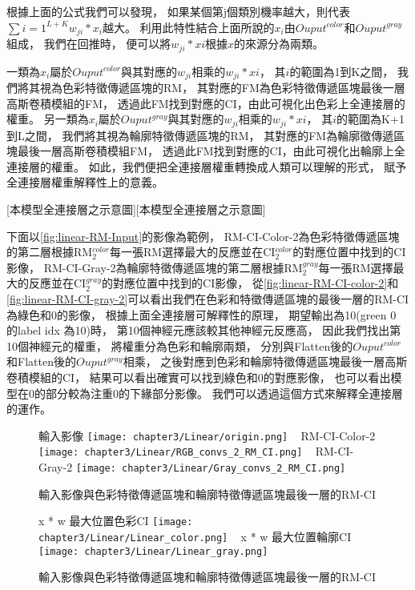 \documentclass[class=NCU_thesis, crop=false]{standalone}
\begin{document}
根據上面的公式我們可以發現，
如果某個第j個類別機率越大，則代表$\sum{i=1}^{L+K}w_{ji} * x_{i}$越大。
利用此特性結合上面所說的$x_{i}$由$Ouput^{color}$和$Ouput^{gray}$組成，
我們在回推時，
便可以將$w_{ji} * x{i}$根據$x$的來源分為兩類。

一類為$x_{i}$屬於$Ouput^{color}$與其對應的$w_{ji}$相乘的$w_{ji} * x{i}$，
其$i$的範圍為1到K之間，
我們將其視為色彩特徵傳遞區塊的RM，
其對應的FM為色彩特徵傳遞區塊最後一層高斯卷積模組的FM，
透過此FM找到對應的CI，由此可視化出色彩上全連接層的權重。
另一類為$x_{i}$屬於$Ouput^{gray}$與其對應的$w_{ji}$相乘的$w_{ji} * x{i}$，
其$i$的範圍為K+1到L之間，
我們將其視為輪廓特徵傳遞區塊的RM，
其對應的FM為輪廓徵傳遞區塊最後一層高斯卷積模組FM，
透過此FM找到對應的CI，由此可視化出輪廓上全連接層的權重。
如此，我們便把全連接層權重轉換成人類可以理解的形式，
賦予全連接層權重解釋性上的意義。

[本模型全連接層之示意圖][本模型全連接層之示意圖]

下面以\cref{fig:linear-RM-Input}的影像為範例，
RM-CI-Color-2為色彩特徵傳遞區塊的第二層根據RM$^{color}_{2}$每一張RM選擇最大的反應並在CI$^{color}_{2}$的對應位置中找到的CI影像，
RM-CI-Gray-2為輪廓特徵傳遞區塊的第二層根據RM$^{gray}_{2}$每一張RM選擇最大的反應並在CI$^{gray}_{2}$的對應位置中找到的CI影像，
從\cref{fig:linear-RM-CI-color-2}和\cref{fig:linear-RM-CI-gray-2}可以看出我們在色彩和特徵傳遞區塊的最後一層的RM-CI為綠色和0的影像，
根據上面全連接層可解釋性的原理，
期望輸出為10(green 0 的label idx 為10)時，
第10個神經元應該較其他神經元反應高，
因此我們找出第10個神經元的權重，
將權重分為色彩和輪廓兩類，
分別與Flatten後的$Ouput^{color}$和Flatten後的$Ouput^{gray}$相乘，
之後對應到色彩和輪廓特徵傳遞區塊最後一層高斯卷積模組的CI，
結果可以看出確實可以找到綠色和0的對應影像，
也可以看出模型在0的部分較為注重0的下緣部分影像。
我們可以透過這個方式來解釋全連接層的運作。

\begin{figure}[H]
    \centering
    \subcaptionbox
        {輸入影像
        \label{fig:linear-RM-Input}}
        {\texttt{[image: chapter3/Linear/origin.png]}}
    ~
    \subcaptionbox
        {RM-CI-Color-2
        \label{fig:linear-RM-CI-color-2}}
        {\texttt{[image: chapter3/Linear/RGB\_convs\_2\_RM\_CI.png]}}
    ~
    \subcaptionbox
        {RM-CI-Gray-2
        \label{fig:linear-RM-CI-gray-2}}
        {\texttt{[image: chapter3/Linear/Gray\_convs\_2\_RM\_CI.png]}}
    \caption{輸入影像與色彩特徵傳遞區塊和輪廓特徵傳遞區塊最後一層的RM-CI\cite{YangCNNInterpretable}}
    \label{fig:RM-CI}
\end{figure}

\begin{figure}[H]
    \centering
    \subcaptionbox
        {x * w 最大位置色彩CI
        \label{fig:linear-rgb}}
        {\texttt{[image: chapter3/Linear/Linear\_color.png]}}
    ~
    \subcaptionbox
        {x * w 最大位置輪廓CI
        \label{fig:linear-gray}}
        {\texttt{[image: chapter3/Linear/Linear\_gray.png]}}
    \caption{輸入影像與色彩特徵傳遞區塊和輪廓特徵傳遞區塊最後一層的RM-CI\cite{YangCNNInterpretable}}
    \label{fig:Linear-w-x}
\end{figure}
\end{document}

